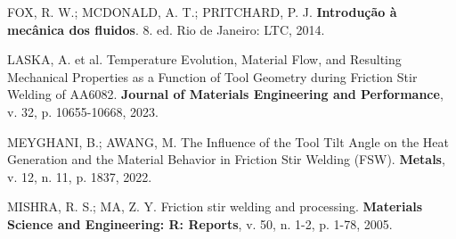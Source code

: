 \documentclass[12pt,openany]{report}
\begin{document}
\begin{singlespace}
FOX, R. W.; MCDONALD, A. T.; PRITCHARD, P. J. \textbf{Introdução à mecânica dos fluidos}. 8. ed. Rio de Janeiro: LTC, 2014.

LASKA, A. et al. Temperature Evolution, Material Flow, and Resulting Mechanical Properties as a Function of Tool Geometry during Friction Stir Welding of AA6082. \textbf{Journal of Materials Engineering and Performance}, v. 32, p. 10655-10668, 2023.

MEYGHANI, B.; AWANG, M. The Influence of the Tool Tilt Angle on the Heat Generation and the Material Behavior in Friction Stir Welding (FSW). \textbf{Metals}, v. 12, n. 11, p. 1837, 2022.

MISHRA, R. S.; MA, Z. Y. Friction stir welding and processing. \textbf{Materials Science and Engineering: R: Reports}, v. 50, n. 1-2, p. 1-78, 2005.
\end{singlespace}
\end{document}
